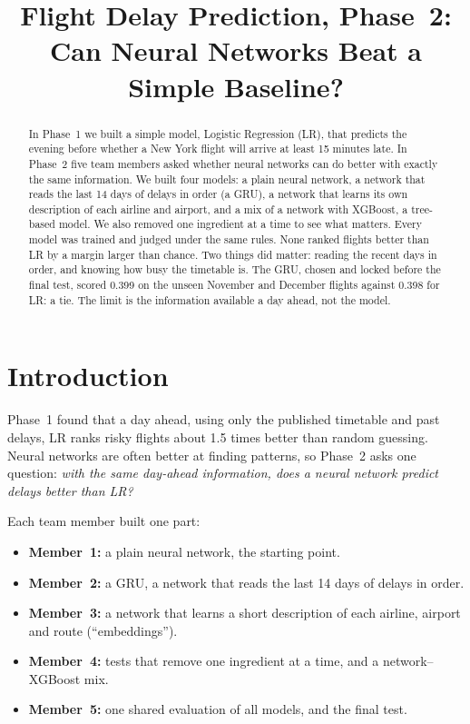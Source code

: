 \documentclass[conference]{IEEEtran}
\begin{document}
\title{Flight Delay Prediction, Phase~2:\\ Can Neural Networks Beat a Simple Baseline?}

\author{}

\maketitle

\begin{abstract}
In Phase~1 we built a simple model, Logistic Regression (LR), that predicts the evening before
whether a New York flight will arrive at least 15 minutes late. In Phase~2 five team members asked
whether neural networks can do better with exactly the same information. We built four models: a
plain neural network, a network that reads the last 14 days of delays in order (a GRU), a network
that learns its own description of each airline and airport, and a mix of a network with XGBoost,
a tree-based model. We also removed one ingredient at a time to see what matters. Every model was
trained and judged under the same rules. None ranked flights better than LR by a margin larger than
chance. Two things did matter: reading the recent days in order, and knowing how busy the timetable
is. The GRU, chosen and locked before the final test, scored 0.399 on the unseen November and
December flights against 0.398 for LR: a tie. The limit is the information available a day ahead,
not the model.
\end{abstract}

\section{Introduction}
Phase~1 found that a day ahead, using only the published timetable and past delays, LR ranks risky
flights about 1.5 times better than random guessing. Neural networks are often better at finding
patterns, so Phase~2 asks one question: \emph{with the same day-ahead information, does a neural
network predict delays better than LR?}

Each team member built one part:
\begin{itemize}
  \item \textbf{Member~1:} a plain neural network, the starting point.
  \item \textbf{Member~2:} a GRU, a network that reads the last 14 days of delays in order.
  \item \textbf{Member~3:} a network that learns a short description of each airline, airport and
  route (``embeddings'').
  \item \textbf{Member~4:} tests that remove one ingredient at a time, and a network--XGBoost mix.
  \item \textbf{Member~5:} one shared evaluation of all models, and the final test.
\end{itemize}
\end{document}
